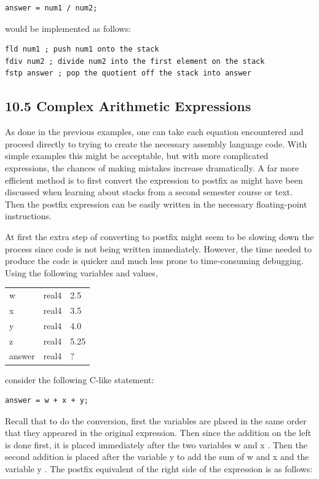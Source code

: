 \documentclass[10pt]{book}
\begin{document}
\begin{verbatim}
answer = num1 / num2;
\end{verbatim}

would be implemented as follows:

\begin{verbatim}
fld num1 ; push num1 onto the stack
fdiv num2 ; divide num2 into the first element on the stack
fstp answer ; pop the quotient off the stack into answer
\end{verbatim}

\subsection*{10.5 Complex Arithmetic Expressions}
As done in the previous examples, one can take each equation encountered and proceed directly to trying to create the necessary assembly language code. With simple examples this might be acceptable, but with more complicated expressions, the chances of making mistakes increase dramatically. A far more efficient method is to first convert the expression to postfix as might have been discussed when learning about stacks from a second semester course or text. Then the postfix expression can be easily written in the necessary floating-point instructions.

At first the extra step of converting to postfix might seem to be slowing down the process since code is not being written immediately. However, the time needed to produce the code is quicker and much less prone to time-consuming debugging. Using the following variables and values,

\begin{center}
\begin{tabular}{lll}
w & real4 & 2.5 \\
x & real4 & 3.5 \\
y & real4 & 4.0 \\
z & real4 & 5.25 \\
answer & real4 & $?$ \\
\end{tabular}
\end{center}

consider the following C-like statement:

\begin{verbatim}
answer = w + x + y;
\end{verbatim}

Recall that to do the conversion, first the variables are placed in the same order that they appeared in the original expression. Then since the addition on the left is done first, it is placed immediately after the two variables w and x . Then the second addition is placed after the variable y to add the sum of w and x and the variable y . The postfix equivalent of the right side of the expression is as follows:
\end{document}
